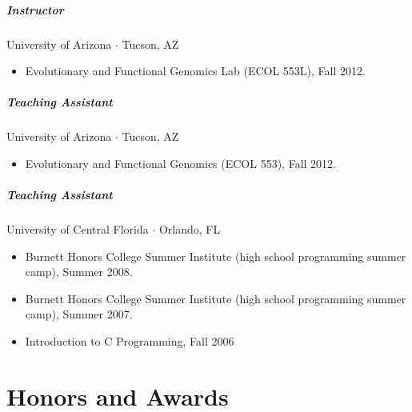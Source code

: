 \documentclass[10pt,letterpaper]{article}
\newcommand{\bigdot}{$\cdot$\xspace}
\begin{document}
\subparagraph{Instructor} University of Arizona \bigdot Tucson, AZ
\begin{itemize}
    \item Evolutionary and Functional Genomics Lab (ECOL 553L), Fall 2012.
\end{itemize}

\subparagraph{Teaching Assistant}
University of Arizona \bigdot Tucson, AZ
\begin{itemize}
    \item Evolutionary and Functional Genomics (ECOL 553), Fall 2012.
\end{itemize}

\subparagraph{Teaching Assistant}
University of Central Florida \bigdot Orlando, FL
\begin{itemize}
    \item Burnett Honors College Summer Institute (high school programming summer camp), Summer 2008.
    \item Burnett Honors College Summer Institute (high school programming summer camp), Summer 2007.
    \item Introduction to C Programming, Fall 2006
\end{itemize}

\section*{Honors and Awards}
\end{document}
